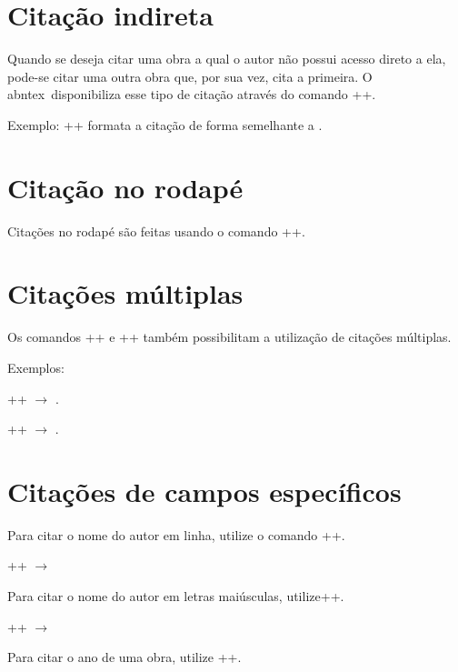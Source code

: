 \documentclass[xindy,rascunho]{fei}
\begin{document}
\begin{teorema}
	\section{Citação indireta}
	Quando se deseja citar uma obra a qual o autor não possui acesso direto a ela, pode-se citar uma outra obra que, por sua vez, cita a primeira. O \gls{abntex}~disponibiliza esse tipo de citação através do comando \latexinline++.
	
	Exemplo: \latexinline++ formata a citação de forma semelhante a .
	
	\section{Citação no rodapé}
	
	Citações no rodapé são feitas usando o comando \latexinline++.
	
	\section{Citações múltiplas}
	
	Os comandos \latexinline+\cite{obra_1,...,obra_n}+ e \latexinline++ também possibilitam a utilização de citações múltiplas.
	
	Exemplos: 
	
	\latexinline+\cite{Mcc43,RusselNo10,haykin99a}+ \(\to\) \cite{Mcc43,RusselNo10,haykin99a}.
	
	\latexinline++ \(\to\) .
	
	\section{Citações de campos específicos}
	
	Para citar o nome do autor em linha, utilize o comando \latexinline++.

	\latexinline++ \(\to\) 
	
	Para citar o nome do autor em letras maiúsculas, utilize\latexinline+\citeauthor{obra}+.

	\latexinline+\citeauthor{galilei_dialogue_1953}+ \(\to\) \citeauthor{galilei_dialogue_1953}

	Para citar o ano de uma obra, utilize \latexinline+\citeyear{obra}+.
	

\end{teorema}
\end{document}
